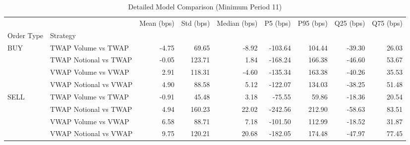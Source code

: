 \begin{table}
\caption{Detailed Model Comparison (Minimum Period 11)}
\label{tab:detailed_min_period_11}
\begin{tabular}{l|l|rrrrrrr}
\toprule
 &  & Mean (bps) & Std (bps) & Median (bps) & P5 (bps) & P95 (bps) & Q25 (bps) & Q75 (bps) \\
Order Type & Strategy &  &  &  &  &  &  &  \\
\midrule
\multirow[t]{4}{*}{BUY} & TWAP Volume vs TWAP & -4.75 & 69.65 & -8.92 & -103.64 & 104.44 & -39.30 & 26.03 \\
 & TWAP Notional vs TWAP & -0.05 & 123.71 & 1.84 & -168.24 & 166.38 & -46.60 & 53.67 \\
 & VWAP Volume vs VWAP & 2.91 & 118.31 & -4.60 & -135.34 & 163.38 & -40.26 & 35.53 \\
 & VWAP Notional vs VWAP & 4.90 & 88.58 & 5.12 & -122.07 & 134.03 & -38.25 & 51.48 \\
\cline{1-9}
\multirow[t]{4}{*}{SELL} & TWAP Volume vs TWAP & -0.91 & 45.48 & 3.18 & -75.55 & 59.86 & -18.36 & 20.54 \\
 & TWAP Notional vs TWAP & 4.94 & 160.23 & 22.02 & -242.56 & 212.90 & -58.63 & 83.51 \\
 & VWAP Volume vs VWAP & 6.58 & 88.71 & 7.18 & -101.50 & 112.99 & -18.52 & 31.87 \\
 & VWAP Notional vs VWAP & 9.75 & 120.21 & 20.68 & -182.05 & 174.48 & -47.97 & 77.45 \\
\cline{1-9}
\bottomrule
\end{tabular}
\end{table}
